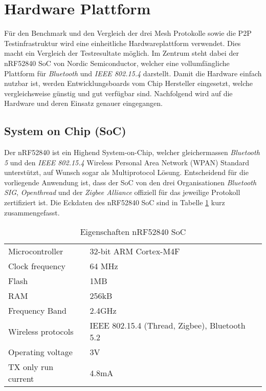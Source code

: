 \clearpage
\section{Hardware Plattform}\label{sec:HardwarePlattform}

Für den Benchmark und den Vergleich der drei Mesh Protokolle sowie die P2P Testinfrastruktur wird eine einheitliche Hardwareplattform verwendet. Dies macht ein Vergleich der Testresultate möglich. Im Zentrum steht dabei der nRF52840 SoC von Nordic Semiconductor, welcher eine vollumfängliche Plattform für \textit{Bluetooth} und \textit{IEEE 802.15.4} darstellt. Damit die Hardware einfach nutzbar ist, werden Entwicklungsboards vom Chip Hersteller eingesetzt, welche vergleichsweise günstig und gut verfügbar sind. Nachfolgend wird auf die Hardware und deren Einsatz genauer eingegangen.


\subsection{System on Chip (SoC)}\label{subsec:SystemonChip}

Der nRF52840 ist ein Highend System-on-Chip, welcher gleichermassen \textit{Bluetooth 5} und den \textit{IEEE 802.15.4} Wireless Personal Area Network (WPAN) Standard unterstützt, auf Wunsch sogar als Multiprotocol Lösung.
Entscheidend für die vorliegende Anwendung ist, dass der SoC von den drei Organisationen \textit{Bluetooth SIG}, \textit{Openthread} und der \textit{Zigbee Alliance} offiziell für das jeweilige Protokoll zertifiziert ist.
Die Eckdaten des nRF52840 SoC sind in Tabelle \ref{tab:EigenschaftennRF52840SoC} kurz zusammengefasst.

\begin{table}[h]
\centering
\begin{tabular}{ll}
\toprule
Microcontroller    & 32-bit ARM Cortex-M4F                        \\
Clock frequency    & 64 MHz                                       \\
Flash              & 1MB                                        \\
RAM                & 256kB \\
Frequency Band     & 2.4GHz   \\
Wireless protocols & IEEE 802.15.4 (Thread, Zigbee), Bluetooth 5.2  \\
Operating voltage  & 3V \\
TX only run current & 4.8mA \\
\bottomrule
\end{tabular}
\caption{Eigenschaften nRF52840 SoC \cite{nordic_semiconductor_asa_nrf52840_2020}\cite{nordic_semiconductor_asa_nrf52840_ps_v11pdf_nodate}}
\label{tab:EigenschaftennRF52840SoC}
\end{table}


